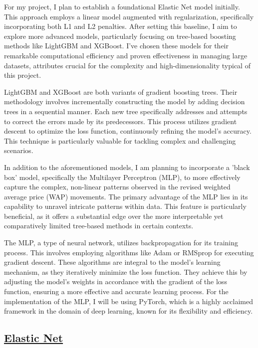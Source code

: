 \documentclass[12pt]{article}
\newtheorem{Proof of Lemma}{Proof of Lemma}
\begin{document}
For my project, I plan to establish a foundational Elastic Net model initially. This approach employs a linear model augmented with regularization, specifically incorporating both L1 and L2 penalties. After setting this baseline, I aim to explore more advanced models, particularly focusing on tree-based boosting methods like LightGBM and XGBoost. I've chosen these models for their remarkable computational efficiency and proven effectiveness in managing large datasets, attributes crucial for the complexity and high-dimensionality typical of this project.

LightGBM and XGBoost are both variants of gradient boosting trees. Their methodology involves incrementally constructing the model by adding decision trees in a sequential manner. Each new tree specifically addresses and attempts to correct the errors made by its predecessors. This process utilizes gradient descent to optimize the loss function, continuously refining the model's accuracy. This technique is particularly valuable for tackling complex and challenging scenarios.

In addition to the aforementioned models, I am planning to incorporate a 'black box' model, specifically the Multilayer Perceptron (MLP), to more effectively capture the complex, non-linear patterns observed in the revised weighted average price (WAP) movements. The primary advantage of the MLP lies in its capability to unravel intricate patterns within data. This feature is particularly beneficial, as it offers a substantial edge over the more interpretable yet comparatively limited tree-based methods in certain contexts.

The MLP, a type of neural network, utilizes backpropagation for its training process. This involves employing algorithms like Adam or RMSprop for executing gradient descent. These algorithms are integral to the model's learning mechanism, as they iteratively minimize the loss function. They achieve this by adjusting the model's weights in accordance with the gradient of the loss function, ensuring a more effective and accurate learning process. For the implementation of the MLP, I will be using PyTorch\citep{paszke2019pytorch}, which is a highly acclaimed framework in the domain of deep learning, known for its flexibility and efficiency.

\subsection*{\href{https://en.wikipedia.org/wiki/Elastic_net_regularization}{Elastic Net}}
\end{document}
